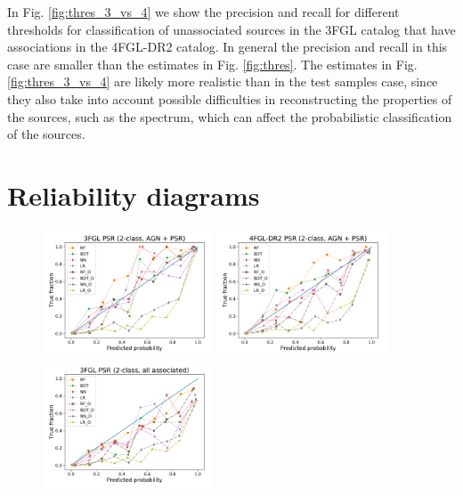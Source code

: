 \documentclass[referee]{aa} %
\newcommand{\lb}{\label}
\begin{document}
\begin{appendix}
In Fig. \ref{fig:thres_3_vs_4} we show the precision and recall for different thresholds for classification of unassociated sources in the 3FGL catalog that have associations in the 4FGL-DR2 catalog. In general the precision and recall in this case are smaller than the estimates in Fig. \ref{fig:thres}.  The estimates in Fig. \ref{fig:thres_3_vs_4} are likely more realistic than in the test samples case, since they also take into account possible difficulties in reconstructing the properties of the sources, such as the spectrum, which can affect the probabilistic classification of the sources.
\newpage
\section{Reliability diagrams}
\lb{sec:reliability}


\begin{figure}[h!t]
\centering
\includegraphics[width=0.45\textwidth]{plots/reliability/calibration_PSR_3FGL_2classes_AGN_PSR.pdf}
\includegraphics[width=0.45\textwidth]{plots/reliability/calibration_PSR_4FGL-DR2_2classes_AGN_PSR.pdf} \\ 
\includegraphics[width=0.45\textwidth]{plots/reliability/calibration_PSR_3FGL_2classes_all_assoc.pdf}

\end{figure}
\end{appendix}
\end{document}
